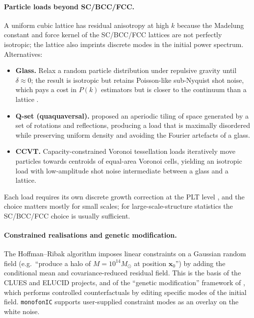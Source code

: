 \documentclass[12pt]{article}
\begin{document}
\paragraph{Particle loads beyond SC/BCC/FCC.}
A uniform cubic lattice has residual anisotropy at high $k$ because
the Madelung constant and force kernel of the SC/BCC/FCC lattices are
not perfectly isotropic; the lattice also imprints discrete modes in
the initial power spectrum.  Alternatives:
%
\begin{itemize}
  \item \textbf{Glass.}  Relax a random particle distribution under
        repulsive gravity until $\delta \approx 0$; the result is
        isotropic but retains Poisson-like sub-Nyquist shot noise,
        which pays a cost in $P(k)$ estimators but is closer to the
        continuum than a lattice \citep{Michaux2020}.
  \item \textbf{Q-set (quaquaversal).}  \citet{Hansen2007} proposed
        an aperiodic tiling of space generated by a set of rotations
        and reflections, producing a load that is maximally disordered
        while preserving uniform density and avoiding the Fourier
        artefacts of a glass.
  \item \textbf{CCVT.}  Capacity-constrained Voronoi tessellation
        loads \citep{Liao2018} iteratively move particles towards
        centroids of equal-area Voronoi cells, yielding an isotropic
        load with low-amplitude shot noise intermediate between a
        glass and a lattice.
\end{itemize}
%
Each load requires its own discrete growth correction at the PLT level
\citep{MarcosEtal2006,Garrison2016}, and the choice matters mostly for
small scales; for large-scale-structure statistics the SC/BCC/FCC
choice is usually sufficient.

\paragraph{Constrained realisations and genetic modification.}
The Hoffman--Ribak algorithm \citep{HoffmanRibak1991} imposes linear
constraints on a Gaussian random field (e.g.\ ``produce a halo of
$M = 10^{14} M_\odot$ at position $\mathbf{x}_0$'') by adding the
conditional mean and covariance-reduced residual field.  This is the
basis of the CLUES and ELUCID projects, and of the ``genetic
modification'' framework of \citet{Roth2016}, which performs
controlled counterfactuals by editing specific modes of the initial
field.  \texttt{monofonIC} supports user-supplied constraint modes as
an overlay on the white noise.
\end{document}
